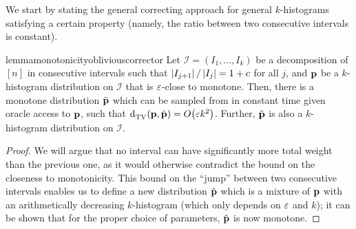 We start by stating the general correcting approach for general $k$-histograms satisfying a certain property (namely, the ratio between two consecutive intervals is constant).
\begin{restatable}{lemma}{monotonicityobliviouscorrector}\label{theorem:oblivious:corrector}
Let $\mathcal{I}=(I_1,\dots,I_{k})$ be a decomposition of $[n]$ in consecutive intervals such that $\left\lvert I_{j+1} \right\rvert/\left\lvert I_j \right\rvert = 1+c$ for all $j$, and $\mathbf{p}$ be a $k$-histogram distribution on $\mathcal{I}$ that is $\varepsilon$-close to monotone. Then, there is a monotone distribution $\tilde{\mathbf{p}}$ which can be sampled from in constant time given oracle access to $\mathbf{p}$, such that $\totalvardist{\D}{\tilde{\D}} = \bigO{\eps k^2}$.
Further, $\tilde{\mathbf{p}}$ is also a $k$-histogram distribution on $\mathcal{I}$.
\end{restatable}
\begin{proof} We will argue that no interval can have significantly more total weight than the previous one, as it would otherwise contradict the bound on the closeness to monotonicity. This bound on the ``jump'' between two consecutive intervals enables us to define a new distribution $\hat{\mathbf{p}}$ which is a mixture of $\mathbf{p}$ with an arithmetically decreasing $k$-histogram (which only depends on $\varepsilon$ and $k$); it can be shown that for the proper choice of parameters, $\hat{\mathbf{p}}$ is now monotone.\smallskip


\end{proof}
